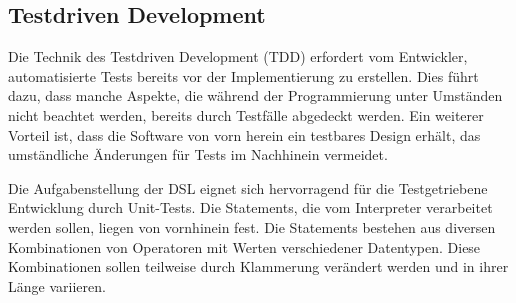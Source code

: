 \subsection{Testdriven Development}

Die Technik des Testdriven Development (TDD) erfordert vom Entwickler, automatisierte Tests bereits vor der Implementierung zu erstellen. Dies führt dazu, dass manche Aspekte, die während der Programmierung unter Umständen nicht beachtet werden, bereits durch Testfälle abgedeckt werden. Ein weiterer Vorteil ist, dass die Software von vorn herein ein testbares Design erhält, das umständliche Änderungen für Tests im Nachhinein vermeidet.

Die Aufgabenstellung der DSL eignet sich hervorragend für die Testgetriebene Entwicklung durch Unit-Tests. Die Statements, die vom Interpreter verarbeitet werden sollen, liegen von vornhinein fest. Die Statements bestehen aus diversen Kombinationen von Operatoren mit Werten verschiedener Datentypen. Diese Kombinationen sollen teilweise durch Klammerung verändert werden und in ihrer Länge variieren.








